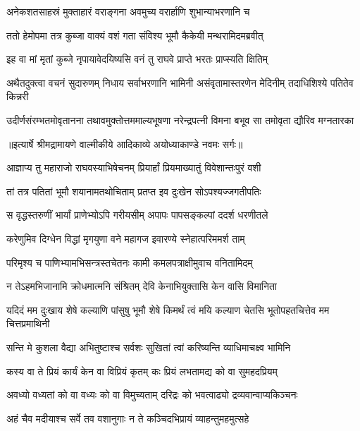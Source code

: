 \twolineshloka
{अनेकशतसाहस्रं मुक्ताहारं वराङ्गना}
{अवमुच्य वरार्हाणि शुभान्याभरणानि च} %

\twolineshloka
{ततो हेमोपमा तत्र कुब्जा वाक्यं वशं गता}
{संविश्य भूमौ कैकेयी मन्थरामिदमब्रवीत्} %

\twolineshloka
{इह वा मां मृतां कुब्जे नृपायावेदयिष्यसि}
{वनं तु राघवे प्राप्ते भरतः प्राप्स्यति क्षितिम्} %

\fourlineindentedshloka
{अथैतदुक्त्वा वचनं सुदारुणम्}
{निधाय सर्वाभरणानि भामिनी}
{असंवृतामास्तरणेन मेदिनीम्}
{तदाधिशिश्ये पतितेव किन्नरी} %

\fourlineindentedshloka
{उदीर्णसंरम्भतमोवृतानना}
{तथावमुक्तोत्तममाल्यभूषणा}
{नरेन्द्रपत्नी विमना बभूव सा}
{तमोवृता द्यौरिव मग्नतारका} %


{॥इत्यार्षे श्रीमद्रामायणे वाल्मीकीये आदिकाव्ये अयोध्याकाण्डे नवमः सर्गः॥}


\twolineshloka
{आज्ञाप्य तु महाराजो राघवस्याभिषेचनम्}
{प्रियार्हां प्रियमाख्यातुं विवेशान्तःपुरं वशी} %

\twolineshloka
{तां तत्र पतितां भूमौ शयानामतथोचिताम्}
{प्रतप्त इव दुःखेन सोऽपश्यज्जगतीपतिः} %

\twolineshloka
{स वृद्धस्तरुणीं भार्यां प्राणेभ्योऽपि गरीयसीम्}
{अपापः पापसङ्कल्पां ददर्श धरणीतले} %

\twolineshloka
{करेणुमिव दिग्धेन विद्धां मृगयुणा वने}
{महागज इवारण्ये स्नेहात्परिममर्श ताम्} %

\twolineshloka
{परिमृश्य च पाणिभ्यामभिसन्त्रस्तचेतनः}
{कामी कमलपत्राक्षीमुवाच वनितामिदम्} %

\twolineshloka
{न तेऽहमभिजानामि क्रोधमात्मनि संश्रितम्}
{देवि केनाभियुक्तासि केन वासि विमानिता} %

\threelineshloka
{यदिदं मम दुःखाय शेषे कल्याणि पांसुषु}
{भूमौ शेषे किमर्थं त्वं मयि कल्याण चेतसि}
{भूतोपहतचित्तेव मम चित्तप्रमाथिनी} %

\twolineshloka
{सन्ति मे कुशला वैद्या अभितुष्टाश्च सर्वशः}
{सुखितां त्वां करिष्यन्ति व्याधिमाचक्ष्व भामिनि} %

\twolineshloka
{कस्य वा ते प्रियं कार्यं केन वा विप्रियं कृतम्}
{कः प्रियं लभतामद्य को वा सुमहदप्रियम्} %

\twolineshloka
{अवध्यो वध्यतां को वा वध्यः को वा विमुच्यताम्}
{दरिद्रः को भवत्वाढ्यो द्रव्यवान्वाप्यकिञ्चनः} %

\twolineshloka
{अहं चैव मदीयाश्च सर्वे तव वशानुगाः}
{न ते कञ्चिदभिप्रायं व्याहन्तुमहमुत्सहे} %

